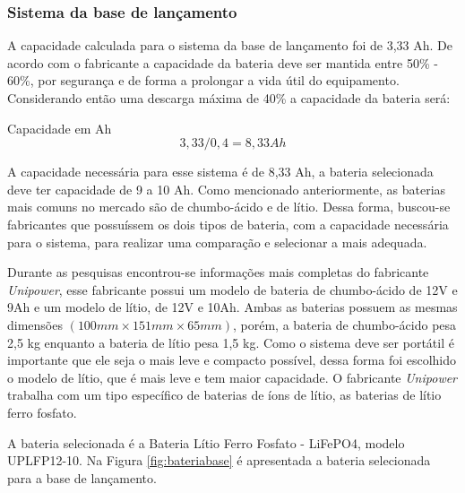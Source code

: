 \subsubsection{Sistema da base de lançamento} 

A capacidade calculada para o sistema da base de lançamento foi de 3,33 Ah. De acordo com o fabricante a capacidade da bateria deve ser mantida entre 50\% - 60\%, por segurança e de forma a prolongar a vida útil do equipamento. Considerando então uma descarga máxima de 40\% a capacidade da bateria será:

Capacidade em Ah
\begin{equation}
     3,33/0,4 = 8,33 Ah
\end{equation}

A capacidade necessária para esse sistema é de 8,33 Ah, a bateria selecionada deve ter capacidade de 9 a 10 Ah. Como mencionado anteriormente, as baterias mais comuns no mercado são de chumbo-ácido e de lítio. Dessa forma, buscou-se fabricantes que possuíssem os dois tipos de bateria, com a capacidade necessária para o sistema, para realizar uma comparação e selecionar a mais adequada.

Durante as pesquisas encontrou-se informações mais completas do fabricante \textit{Unipower}, esse fabricante possui um modelo de bateria de chumbo-ácido de 12V e 9Ah e um modelo de lítio, de 12V e 10Ah. Ambas as baterias possuem as mesmas dimensões $(100mm \times 151mm \times 65mm)$, porém, a bateria de chumbo-ácido pesa 2,5 kg enquanto a bateria de lítio pesa 1,5 kg. Como o sistema deve ser portátil é importante que ele seja o mais leve e compacto possível, dessa forma foi escolhido o modelo de lítio, que é mais leve e tem maior capacidade. O fabricante \textit{Unipower} trabalha com um tipo específico de baterias de íons de lítio, as baterias de lítio ferro fosfato.

A bateria selecionada é a Bateria Lítio Ferro Fosfato - LiFePO4, modelo UPLFP12-10.  Na Figura \ref{fig:bateriabase} é apresentada a bateria selecionada para a base de lançamento. 

